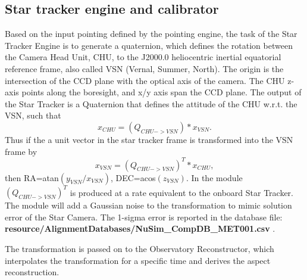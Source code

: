 \subsection{Star tracker engine and calibrator}
Based on the input pointing defined by the pointing engine, the task of the Star Tracker Engine is to generate a quaternion, which defines the rotation between the Camera Head Unit, CHU, to the J2000.0 heliocentric inertial equatorial reference frame, also called VSN (Vernal, Summer, North). The origin is the intersection of the CCD plane with the optical axis of the camera. The CHU z-axis points along the boresight, and x/y axis span the CCD plane.
The output of the Star Tracker is a Quaternion that defines the attitude of the CHU w.r.t. the VSN, such that
\begin{equation} 
x_{CHU}=(Q_{CHU->VSN}) * x_{VSN}. 
\end{equation}
Thus if the a unit vector in the star tracker frame is transformed into the VSN frame by 
\begin{equation}
x_{VSN}=(Q_{CHU->VSN} )^T* x_{CHU}, 
\end{equation}
then RA=atan$(y_{VSN}/x_{VSN})$, DEC=acos$(z_{VSN})$. In the module $(Q_{CHU->VSN})^T$ is produced at a rate equivalent to the onboard Star Tracker. The module will add a Gaussian noise to the transformation to mimic solution error of the Star Camera. The 1-sigma error is reported in the database file:\\ \textbf{resource/AlignmentDatabases/NuSim\_CompDB\_MET001.csv} .

 The transformation is passed on to the Observatory Reconstructor, which interpolates the transformation for a specific time and derives the aspect reconstruction.

